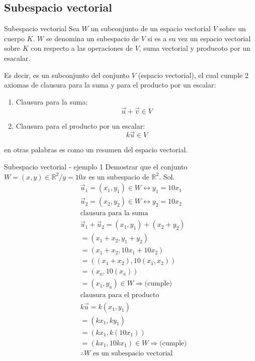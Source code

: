 \subsection*{Subespacio vectorial}
\begin{Theorem*} {Subespacio vectorial}
	Sea $W$ un subconjunto de un espacio vectorial $V$ sobre un cuerpo $K$. $W$ se denomina un subespacio de $V$ si es a su vez un espacio vectorial sobre $K$ con respecto a las operaciones de $V$, suma vectorial y producoto por un esacalar. 
\end{Theorem*}
Es decir, es un subconjunto del conjunto $V$ (espacio vectorial), el cual cumple 2 axiomas de clausura para la suma y para el producto por un escalar:
\begin{enumerate}
	\item Clausura para la suma:
	$$ \vec{u}+\vec{v}\in V $$
	\item Clausura para el producto por un escalar:
	$$ k\vec{u}\in V $$
\end{enumerate}
\noindent en otras palabras es como un resumen del espacio vectorial.
\begin{Example*} {Subespacio vectorial - ejemplo 1}
	Demostrar que el conjunto $W={(x,y)\in\mathbb{R}^2/y=10x}$ es un subespacio de $\mathbb{R}^2$.
	Sol.
	\begin{align*}
		&\vec{u}_1=(x_1,y_1)\in W\leftrightarrow y_1=10x_1\\
		&\vec{u}_2=(x_2,y_2)\in W\leftrightarrow y_2=10x_2\\
		&\text{clausura para la suma}\\
		&\vec{u}_1+\vec{u}_2=(x_1,y_1)+(x_2+y_2)\\
		&=(x_1+x_2,y_1+y_2)\\
		&=(x_1+x_2,10x_1+10x_2)\\
		&=((x_1+x_2),10(x_1,x_2))\\
		&=(x_a,10(x_a))\\
		&=(x_1,y_a)\in W\Longrightarrow\text{(cumple)}\\
		&\text{clausura para el producto}\\
		&k\vec{u}=k(x_1,y_1)\\
		&=(kx_1,ky_1)\\
		&=(kx_1,k(10x_1))\\
		&=(kx_1,10kx_1)\in W \Longrightarrow\text{(cumple)}\\
		&\therefore W \text{ es un subespacio vectorial}
	\end{align*}
\end{Example*}
